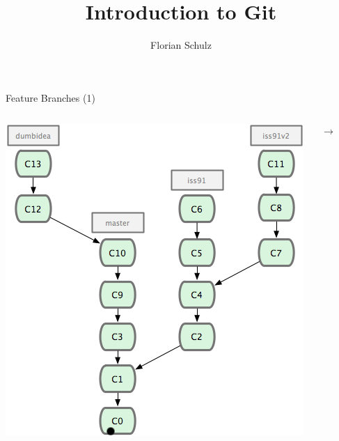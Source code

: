 \documentclass{beamer}
\title[Git]{Introduction to Git}
\author{Florian Schulz}
\begin{document}
\begin{frame}
\titlepage
\end{frame}

\begin{frame}{Feature Branches (1)}
\begin{columns}[T]
  \begin{column}{.45\textwidth}
    \begin{block}{}
      \includegraphics[scale=0.6]{images/feature-branches1.png}
    \end{block}
  \end{column}
  \begin{column}{.1\textwidth}
    \begin{block}{}
      \pause $\longrightarrow$
    \end{block}
  \end{column}
  \begin{column}{.45\textwidth}
    \begin{block}{}  

\end{block}
\end{column}
\end{columns}
\end{frame}
\end{document}
